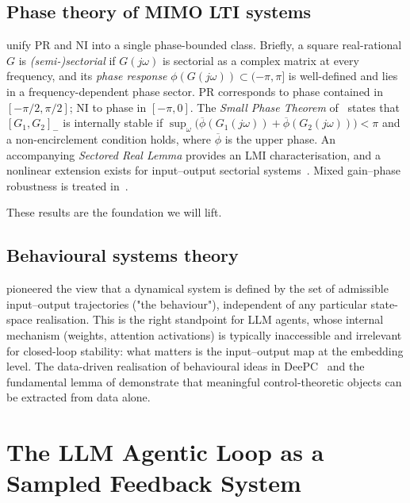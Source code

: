 \documentclass[11pt,a4paper]{article}
\theoremstyle{definition}
\theoremstyle{remark}
\begin{document}
\subsection{Phase theory of MIMO LTI systems}\label{ssec:phase-theory}

\citet{Chen2023PhaseTheory} unify PR and NI into a single phase-bounded
class.  Briefly, a square real-rational $G$ is \emph{(semi-)sectorial} if
$G(j\omega)$ is sectorial as a complex matrix at every frequency, and
its \emph{phase response}
$\phi(G(j\omega))\subset(-\pi,\pi]$ is well-defined and lies in a frequency-dependent
phase sector.  PR corresponds to phase contained in
$[-\pi/2,\pi/2]$; NI to phase in $[-\pi,0]$.  The
\emph{Small Phase Theorem} of~\citet{Chen2023PhaseTheory} states that
$[G_{1},G_{2}]_{-}$ is internally stable if
$\sup_{\omega}\bigl(\overline\phi(G_{1}(j\omega))+\overline\phi(G_{2}(j\omega))\bigr)<\pi$
and a non-encirclement condition holds, where $\overline\phi$ is the upper
phase.  An accompanying \emph{Sectored Real Lemma} provides an LMI
characterisation, and a nonlinear extension exists for input--output
sectorial systems~\citep{Chen2021PhaseNonlinear}.  Mixed gain--phase
robustness is treated in~\citep{Zhao2022SmallGainSmallPhase}.

These results are the foundation we will lift.

\subsection{Behavioural systems theory}\label{ssec:behavioural}

\citet{Willems1986Behavioural,Willems2007Behavioural} pioneered the view
that a dynamical system is defined by the set of admissible
input--output trajectories ("the behaviour"), independent of any
particular state-space realisation.  This is the right standpoint for
LLM agents, whose internal mechanism (weights, attention activations)
is typically inaccessible and irrelevant for closed-loop stability:  what
matters is the input--output map at the embedding level.  The
data-driven realisation of behavioural ideas in
DeePC~\citep{Coulson2019DeePC} and the fundamental lemma of
\citet{Willems2005FundamentalLemma} demonstrate that meaningful
control-theoretic objects can be extracted from data alone.

\section{The LLM Agentic Loop as a Sampled Feedback System}\label{sec:agent-model}
\end{document}
